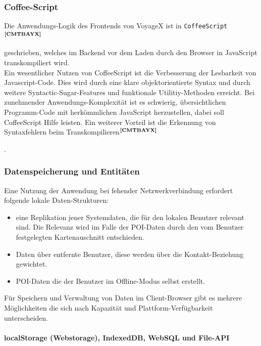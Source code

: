 \subsubsection{Coffee-Script}
Die Anwendungs-Logik des Frontends von VoyageX ist in \texttt{CoffeeScript}$^{\textbf{\ref{CMTBAYX}}}$%
\addtocounter{footnote}{1}%
 geschrieben, welches im Backend vor dem Laden durch den Browser in JavaScript transkompiliert wird.\\
Ein wesentlicher Nutzen von CoffeeScript ist die Verbesserung der Lesbarkeit von Javascript-Code. Dies wird durch eine klare objektorientierte Syntax und durch weitere Syntactic-Sugar-Features und funktionale Utilitiy-Methoden erreicht. Bei zunehmender Anwendungs-Komplexität ist es schwierig, übersichtlichen Programm-Code mit herkömmlichen JavaScript herzustellen, dabei soll CoffeeScript Hilfe leisten. Ein weiterer Vorteil ist die Erkennung von Syntaxfehlern beim Transkompilieren$^{\textbf{\ref{CMTBAYX}}}$%
\addtocounter{footnote}{1}%
. 

\subsubsection{Datenspeicherung und Entitäten}\label{5_DSE}
Eine Nutzung der Anwendung bei fehender Netzwerkverbindung erfordert folgende lokale Daten-Strukturen:
\begin{itemize}[leftmargin=*,noitemsep,topsep=1ex,parsep=0pt,partopsep=0pt]
\item eine Replikation jener Systemdaten, die für den lokalen Benutzer relevant sind. Die Relevanz wird im Falle der POI-Daten durch den vom Benutzer festgelegten Kartenauschnitt entschieden. 
\item Daten über entfernte Benutzer, diese werden über die Kontakt-Beziehung gewichtet.
\item POI-Daten die der Benutzer im Offline-Modus selbst erstellt.
\end{itemize}
Für Speichern und Verwaltung von Daten im Client-Browser gibt es mehrere Möglichkeiten die sich nach Kapazität und Plattform-Verfügbarkeit unterscheiden.

\paragraph{localStorage (Webstorage), IndexedDB, WebSQL und File-API}


